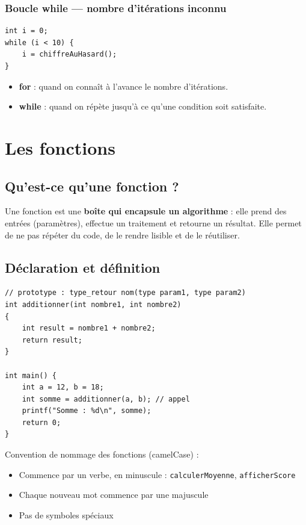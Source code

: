 \documentclass[12pt,a4paper]{article}
\begin{document}
\subsubsection{Boucle while — nombre d'itérations inconnu}

\begin{lstlisting}[caption={Boucle while}]
int i = 0;
while (i < 10) {
    i = chiffreAuHasard();
}
\end{lstlisting}

\begin{regle}
\begin{itemize}
    \item \textbf{for} : quand on connaît à l'avance le nombre d'itérations.
    \item \textbf{while} : quand on répète jusqu'à ce qu'une condition soit satisfaite.
\end{itemize}
\end{regle}

\section{Les fonctions}

\subsection{Qu'est-ce qu'une fonction ?}

Une fonction est une \textbf{boîte qui encapsule un algorithme} : elle prend des entrées (paramètres), effectue un traitement et retourne un résultat. Elle permet de ne pas répéter du code, de le rendre lisible et de le réutiliser.

\subsection{Déclaration et définition}

\begin{lstlisting}[caption={Anatomie d'une fonction}]
// prototype : type_retour nom(type param1, type param2)
int additionner(int nombre1, int nombre2)
{
    int result = nombre1 + nombre2;
    return result;
}

int main() {
    int a = 12, b = 18;
    int somme = additionner(a, b); // appel
    printf("Somme : %d\n", somme);
    return 0;
}
\end{lstlisting}

\begin{regle}
Convention de nommage des fonctions (camelCase) :
\begin{itemize}
    \item Commence par un verbe, en minuscule : \texttt{calculerMoyenne}, \texttt{afficherScore}
    \item Chaque nouveau mot commence par une majuscule
    \item Pas de symboles spéciaux
\end{itemize}
\end{regle}
\end{document}
